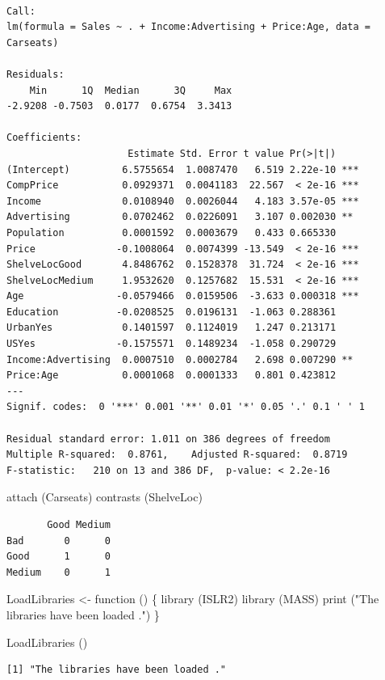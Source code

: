 \documentclass[
  letterpaper,
  DIV=11,
  numbers=noendperiod]{scrartcl}
\newenvironment{Shaded}{\begin{snugshade}}{\end{snugshade}}
\newcommand{\ControlFlowTok}[1]{\textcolor[rgb]{0.00,0.23,0.31}{#1}}
\newcommand{\FunctionTok}[1]{\textcolor[rgb]{0.28,0.35,0.67}{#1}}
\newcommand{\NormalTok}[1]{\textcolor[rgb]{0.00,0.23,0.31}{#1}}
\newcommand{\OtherTok}[1]{\textcolor[rgb]{0.00,0.23,0.31}{#1}}
\newcommand{\StringTok}[1]{\textcolor[rgb]{0.13,0.47,0.30}{#1}}
\begin{document}
\begin{verbatim}

Call:
lm(formula = Sales ~ . + Income:Advertising + Price:Age, data = Carseats)

Residuals:
    Min      1Q  Median      3Q     Max 
-2.9208 -0.7503  0.0177  0.6754  3.3413 

Coefficients:
                     Estimate Std. Error t value Pr(>|t|)    
(Intercept)         6.5755654  1.0087470   6.519 2.22e-10 ***
CompPrice           0.0929371  0.0041183  22.567  < 2e-16 ***
Income              0.0108940  0.0026044   4.183 3.57e-05 ***
Advertising         0.0702462  0.0226091   3.107 0.002030 ** 
Population          0.0001592  0.0003679   0.433 0.665330    
Price              -0.1008064  0.0074399 -13.549  < 2e-16 ***
ShelveLocGood       4.8486762  0.1528378  31.724  < 2e-16 ***
ShelveLocMedium     1.9532620  0.1257682  15.531  < 2e-16 ***
Age                -0.0579466  0.0159506  -3.633 0.000318 ***
Education          -0.0208525  0.0196131  -1.063 0.288361    
UrbanYes            0.1401597  0.1124019   1.247 0.213171    
USYes              -0.1575571  0.1489234  -1.058 0.290729    
Income:Advertising  0.0007510  0.0002784   2.698 0.007290 ** 
Price:Age           0.0001068  0.0001333   0.801 0.423812    
---
Signif. codes:  0 '***' 0.001 '**' 0.01 '*' 0.05 '.' 0.1 ' ' 1

Residual standard error: 1.011 on 386 degrees of freedom
Multiple R-squared:  0.8761,    Adjusted R-squared:  0.8719 
F-statistic:   210 on 13 and 386 DF,  p-value: < 2.2e-16
\end{verbatim}

\begin{Shaded}
\begin{Highlighting}[]
\FunctionTok{attach}\NormalTok{ (Carseats)}
\FunctionTok{contrasts}\NormalTok{ (ShelveLoc)}
\end{Highlighting}
\end{Shaded}

\begin{verbatim}
       Good Medium
Bad       0      0
Good      1      0
Medium    0      1
\end{verbatim}

\begin{Shaded}
\begin{Highlighting}[]
\NormalTok{LoadLibraries }\OtherTok{\textless{}{-}} \ControlFlowTok{function}\NormalTok{ () \{}
 \FunctionTok{library}\NormalTok{ (ISLR2)}
 \FunctionTok{library}\NormalTok{ (MASS)}
 \FunctionTok{print}\NormalTok{ (}\StringTok{"The libraries have been loaded ."}\NormalTok{)}
\NormalTok{ \}}
\end{Highlighting}
\end{Shaded}

\begin{Shaded}
\begin{Highlighting}[]
\FunctionTok{LoadLibraries}\NormalTok{ ()}
\end{Highlighting}
\end{Shaded}

\begin{verbatim}
[1] "The libraries have been loaded ."
\end{verbatim}
\end{document}
